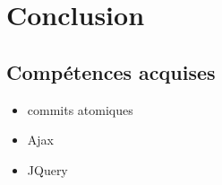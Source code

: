 \chapter{Conclusion}

\section{Compétences acquises}

\begin{itemize}
\item commits atomiques
\item Ajax
\item JQuery
\end{itemize}

